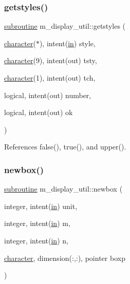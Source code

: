 \subsubsection{\texorpdfstring{getstyles()}{getstyles()}}
{\footnotesize\ttfamily \hyperlink{M__stopwatch_83_8txt_acfbcff50169d691ff02d4a123ed70482}{subroutine} m\+\_\+display\+\_\+util\+::getstyles (\begin{DoxyParamCaption}\item[{\hyperlink{option__stopwatch_83_8txt_abd4b21fbbd175834027b5224bfe97e66}{character}($\ast$), intent(\hyperlink{M__journal_83_8txt_afce72651d1eed785a2132bee863b2f38}{in})}]{style,  }\item[{\hyperlink{option__stopwatch_83_8txt_abd4b21fbbd175834027b5224bfe97e66}{character}(9), intent(out)}]{tsty,  }\item[{\hyperlink{option__stopwatch_83_8txt_abd4b21fbbd175834027b5224bfe97e66}{character}(1), intent(out)}]{tch,  }\item[{logical, intent(out)}]{number,  }\item[{logical, intent(out)}]{ok }\end{DoxyParamCaption})\hspace{0.3cm}{\ttfamily [private]}}



References false(), true(), and upper().

\mbox{\label{namespacem__display__util_a5c3310ac01f093fd857b2a3aa3189e02}} 
\subsubsection{\texorpdfstring{newbox()}{newbox()}}
{\footnotesize\ttfamily \hyperlink{M__stopwatch_83_8txt_acfbcff50169d691ff02d4a123ed70482}{subroutine} m\+\_\+display\+\_\+util\+::newbox (\begin{DoxyParamCaption}\item[{integer, intent(\hyperlink{M__journal_83_8txt_afce72651d1eed785a2132bee863b2f38}{in})}]{unit,  }\item[{integer, intent(\hyperlink{M__journal_83_8txt_afce72651d1eed785a2132bee863b2f38}{in})}]{m,  }\item[{integer, intent(\hyperlink{M__journal_83_8txt_afce72651d1eed785a2132bee863b2f38}{in})}]{n,  }\item[{\hyperlink{option__stopwatch_83_8txt_abd4b21fbbd175834027b5224bfe97e66}{character}, dimension(\+:,\+:), pointer}]{boxp }\end{DoxyParamCaption})\hspace{0.3cm}{\ttfamily [private]}}



